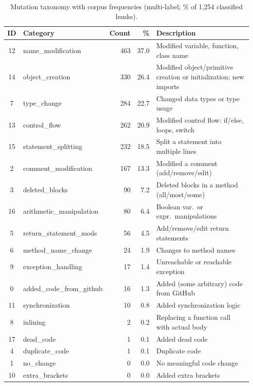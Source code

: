 \documentclass[runningheads]{llncs}
\begin{document}
\begin{table}[t]
\caption{Mutation taxonomy with corpus frequencies (multi-label; \% of 1,254 classified hunks).}
\label{tab:taxonomy}
\centering\footnotesize
\begin{tabularx}{\linewidth}{clrr>{\raggedright\arraybackslash}X}
\toprule
\textbf{ID} & \textbf{Category} & \textbf{Count} & \textbf{\%} & \textbf{Description} \\
\midrule
12 & name\_modification        & 463 & 37.0 & Modified variable, function, class name \\
14 & object\_creation          & 330 & 26.4 & Modified object/primitive creation or initialization; new imports \\
7  & type\_change              & 284 & 22.7 & Changed data types or type usage  \\
13 & control\_flow             & 262 & 20.9 & Modified control flow: if/else, loops, switch \\
15 & statement\_splitting      & 232 & 18.5 & Split a statement into multiple lines \\
2  & comment\_modification     & 167 & 13.3 & Modified a comment (add/remove/edit) \\
3  & deleted\_blocks           &  90 &  7.2 & Deleted blocks in a method (all/most/some) \\
16 & arithmetic\_manipulation  &  80 &  6.4 & Boolean var.\ or expr.\ manipulations \\
5  & return\_statement\_mods   &  56 &  4.5 &   Add/remove/edit return statements\\
6  & method\_name\_change      &  24 &  1.9 & Changes to method names \\
9  & exception\_handling       &  17 &  1.4 & Unreachable or reachable exception \\
0  & added\_code\_from\_github &  16 &  1.3 & Added (some arbitrary) code from GitHub \\
11 & synchronization           &  10 &  0.8 & Added synchronization logic \\
8  & inlining                  &   2 &  0.2 & Replacing a function call with actual body \\
17 & dead\_code                &   1 &  0.1 & Added dead code \\
4  & duplicate\_code           &   1 &  0.1 & Duplicate code \\
1  & no\_change                &   0 &  0.0 & No meaningful code change \\
10 & extra\_brackets           &   0 &  0.0 & Added extra brackets \\
\bottomrule
\end{tabularx}
\end{table}
\end{document}
